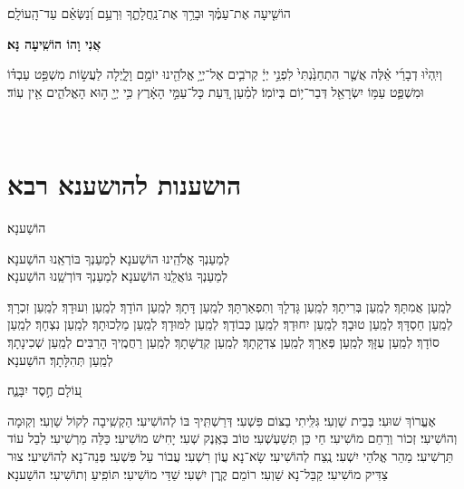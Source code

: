 \documentclass[twoside, openany, parskip=half, 11pt]{book}
\begin{document}
הוֹשִׁ֤יעָה אֶת־עַמֶּ֗ךָ וּבָרֵ֥ךְ אֶת־נַֽחֲלָתֶ֑ךָ וּֽרְעֵ֥ם וְ֝נַשְּׂאֵ֗ם עַד־הָֽעוֹלָֽם׃


\begin{large}
\textbf{אֲנִי וָהוֹ הוֹשִֽׁיעָה נָּא׃}
\end{large}

וְיִֽהְי֨וּ דְבָרַ֜י אֵ֗לֶּה אֲשֶׁ֤ר הִתְחַנַּ֙נְתִּי֙ לִפְנֵ֣י יְיָ֔ קְרֹבִ֛ים אֶל־יְיָ֥ אֱלֹהֵ֖ינוּ יוֹמָ֣ם וָלָ֑יְלָה לַעֲשׂ֣וֹת מִשְׁפַּ֣ט עַבְדּ֗וֹ וּמִשְׁפַּ֛ט עַמּ֥וֹ יִשְׂרָאֵ֖ל דְּבַר־י֥וֹם בְּיוֹמֽוֹ׃ לְמַ֗עַן דַּ֚עַת כָּל־עַמֵּ֣י הָאָ֔רֶץ כִּ֥י יְיָ֖ ה֣וּא הָאֱלֹהִ֑ים אֵ֖ין עֽוֹד׃

\vfill
{}\\

\clearpage

\vspace{-1\baselineskip}
\section[הושענות להושענא רבא]{ הושענות להושענא רבא }

\begin{Large}
הוֹשַׁענָא׃
\end{Large}


לְמַעַנְךָ אֱלֹהֵֽינוּ הוֹשַׁענָא׃ לְמַעַנְךָ בּוֹרְאֵֽנוּ הוֹשַׁענָא׃\\
לְמַעַנְךָ גּוֹאֲלֵֽנוּ הוֹשַׁענָא׃ לְמַעַנְךָ דּוֹרְשֵֽׁנוּ הוֹשַׁענָא׃

לְמַֽעַן אֲמִתָּךְ׃ לְמַֽעַן בְּרִיתָךְ׃ לְמַֽעַן גָּדְלָךְ וְתִפְאַרְתָּךְ׃ לְמַֽעַן דָּתָךְ׃ לְמַֽעַן הוֹדָךְ׃ לְמַֽעַן וִעוּדָךְ׃ לְמַֽעַן זִכְרָךְ׃ לְמַֽעַן חַסְדָּךְ׃ לְמַֽעַן טוּבָךְ׃ לְמַֽעַן יִחוּדָךְ׃ לְמַֽעַן כְּבוֹדָךְ׃ לְמַֽעַן לִמּוּדָךְ׃ לְמַֽעַן מַלְכוּתָךְ׃ לְמַֽעַן נִצְחָךְ׃ לְמַֽעַן סוֹדָךְ׃ לְמַֽעַן עֻזָּךְ׃ לְמַֽעַן פְּאֵרָךְ׃ לְמַֽעַן צִדְקָתָךְ׃ לְמַֽעַן קְדֻשָּׁתָךְ׃ לְמַֽעַן רַחֲמֶֽיךָ הָרַבִּים׃
לְמַֽעַן שְׁכִינָתָךְ׃
לְמַֽעַן תְּהִלָּתָךְ׃ הוֹשַׁענָא׃

ע֭וֹלָם חֶ֣סֶד יִבָּנֶ֑ה׃

אֶעֱרוֹךְ שׁוּעִי׃ בְּבֵית שַׁוְעִי׃ גִּלִּֽיתִי בַצּוֹם פִּשְׁעִי׃ דְּרַשְׁתִּֽיךָ בּוֹ לְהוֹשִׁיעִי׃ הַקְשִֽׁיבָה לְקוֹל שַׁוְעִי׃ וְקֽוּמָה וְהוֹשִׁיעִי׃ זְכוֹר וְרַחֵם מוֹשִׁיעִי׃ חַי כֵּן תְּשַׁעְשְׁעִי׃ טוֹב בְּאֶֽנֶק שְׁעִי׃ יָחִישׁ מוֹשִׁיעִי׃ כַּלֵּה מַרְשִׁיעִי׃ לְבַל עוֹד תַּרְשִׁיעִי׃ מַהֵר אֱלֹהֵי יִשְׁעִי׃ נֶֽצַח לְהוֹשִׁיעִי׃ שָׂא־נָא עֲוֹן רִשְׁעִי׃ עֲבוֹר עַל פִּשְׁעִי׃ פְּנֵה־נָא לְהוֹשִׁיעִי׃ צוּר צַדִּיק מוֹשִׁיעִי׃ קַבֵּל־נָא שַׁוְעִי׃ רוֹמֵם קֶֽרֶן יִשְׁעִי׃
שַׁדַּי מוֹשִׁיעִי׃
תּוֹפִֽיעַ וְתוֹשִׁיעִי׃ הוֹשַׁענָא׃
\end{document}
